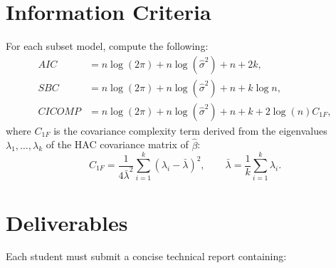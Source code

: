 \documentclass[12pt,thmsa]{article}
\begin{document}
\section*{Information Criteria}

\vspace{1pt}

For each subset model, compute the following: 
\begin{align*}
AIC& =n\log (2\pi )+n\log (\hat{\sigma}^{2})+n+2k, \\
SBC& =n\log (2\pi )+n\log (\hat{\sigma}^{2})+n+k\log n, \\
CICOMP& =n\log (2\pi )+n\log (\hat{\sigma}^{2})+n+k+2\log (n)C_{1F},
\end{align*}%
where $C_{1F}$ is the covariance complexity term derived from the
eigenvalues $\lambda _{1},\dots ,\lambda _{k}$ of the HAC covariance matrix
of $\hat{\beta}$: 
\begin{equation*}
C_{1F}=\frac{1}{4\bar{\lambda}^{2}}\sum_{i=1}^{k}(\lambda _{i}-\bar{\lambda}%
)^{2},\qquad \bar{\lambda}=\frac{1}{k}\sum_{i=1}^{k}\lambda _{i}.
\end{equation*}

\pagebreak

\section{Deliverables}

\vspace{1pt}

Each student must submit a concise technical report containing:
\end{document}
